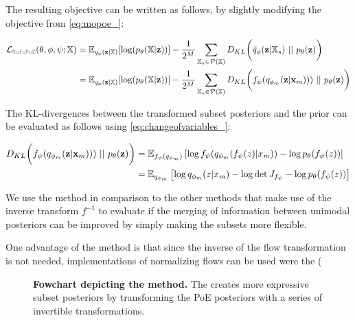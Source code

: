 The resulting objective can be written as follows, by slightly modifying the  objective from \cref{eq:mopoe_}:

\begin{equation}
    \begin{split}
        \mathcal{L}_{\mg{MofoPoE}}(\theta, \phi, \psi; \xset) &=  \mathbb{E}_{q_{\phi}(\textbf{z}|\mathbb{X})}[\log (p_{\theta}(\mathbb{X}|\textbf{z}))] - \frac{1}{2^M} \sum _{\mathbb{X}_s \in \mathcal{P}(\mathbb{X})} D_{KL}\biggl( \tilde{q}_{\phi}(\textbf{z}|\mathbb{X}_s)\ ||\ p_{\theta}(\textbf{z})\biggr)\\
        &= \mathbb{E}_{q_{\phi}(\textbf{z}|\mathbb{X})}[\log (p_{\theta}(\mathbb{X}|\textbf{z}))] - \frac{1}{2^M} \sum _{\mathbb{X}_s \in \mathcal{P}(\mathbb{X})} D_{KL}\biggl( f_{\psi} (\unimodalpost))\ ||\ p_{\theta}(\textbf{z})\biggr)
    \end{split}
\end{equation}

The KL-divergences between the transformed subset posteriors and the prior can be evaluated as follows using \cref{eq:changeofvariables_}:

\begin{equation}
    \begin{split}
        D_{KL}\biggl( f_{\psi} (\unimodalpost))\ ||\ p_{\theta}(\textbf{z})\biggr) &= \mathbb{E}_{f_{\psi}(q_{\phi_m})} \left[ \log  f_{\psi} (q_{\phi_m}(f_{\psi}(z)|x_m)) - \log p_{\theta}(f_{\psi}(z))   \right]\\
        &= \mathbb{E}_{q_{\phi_m}} \left[ \log  q_{\phi_m}(z|x_m) - \log \det J_{f_{\psi}} - \log p_{\theta}(f_{\psi}(z))   \right]\\
    \end{split}
\end{equation}

We use the  method in comparison to the other methods that make use of the inverse transform $f^{-1}$ to evaluate if the merging of information between unimodal posteriors can be improved by simply making the subsets more flexible. %

One advantage of the  method is that since the inverse of the flow transformation is not needed, implementations of normalizing flows can be used were the (%

\begin{figure}[h!]
    \centering
    \caption{\textbf{Fowchart depicting the  method.} The  creates more expressive subset posteriors by transforming the PoE posteriors with a series of invertible transformations.}
    \label{fig:mofopoe}
\end{figure}


